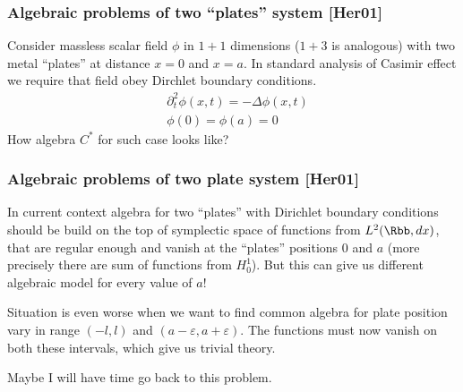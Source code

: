 \documentclass[10pt,t]{beamer}
\begin{document}
\begin{frame}
  \frametitle{Algebraic problems of two ``plates'' system [Her01]}


  Consider massless scalar field $\phi$ in $1 + 1$ dimensions ($1 + 3$
  is analogous) with two metal ``plates'' at distance $x = 0$ and
  $x = a$. In standard analysis of Casimir effect we require that
  field obey Dirchlet boundary conditions.
  \begin{align}
    \label{eq:Herdegens-approach-03-A}
    &\partial_{ t }^{ 2 } \phi( x, t ) = -\Delta \phi( x, t ) \\
    \label{eq:Herdegens-approach-03-B}
    &\phi( 0 ) = \phi( a ) = 0
  \end{align}
  How algebra $C^{ * }$ for such case looks like?

\end{frame}





\begin{frame}
  \frametitle{Algebraic problems of two plate system [Her01]}


  In current context algebra for two ``plates'' with Dirichlet
  boundary conditions should be build on the top of symplectic space
  of functions from $L^{ 2 }( \Rbb, dx )$, that are regular
  enough and vanish at the ``plates'' positions $0$ and $a$ (more
  precisely there are sum of functions from $H_{ 0 }^{ 1 }$). But this
  can give us different algebraic model for every value of $a$!

  Situation is even worse when we want to find common algebra for
  plate position vary in range $( -l, l )$ and
  $( a - \varepsilon, a + \varepsilon )$. The functions must now
  vanish on both these intervals, which give us trivial theory.

  Maybe I will have time go back to this problem.

\end{frame}
\end{document}
